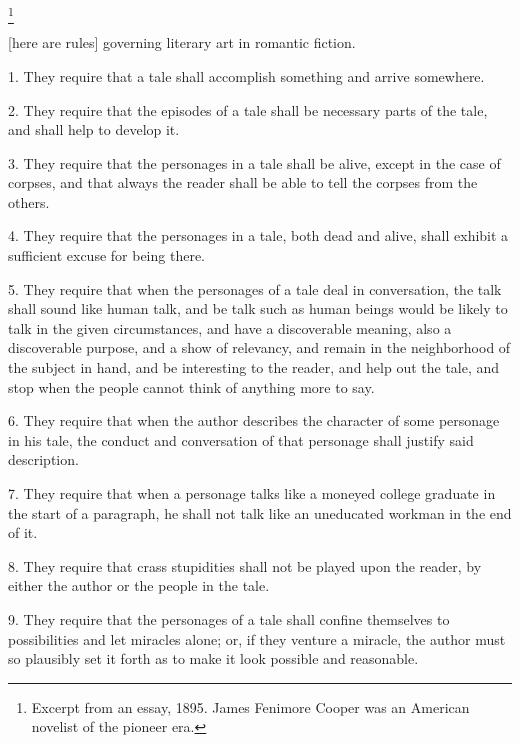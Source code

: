 \documentclass[../../demo.tex]{novelettesubdoc}
\begin{document}
\begin{upperpage}
\null
{}
\footnote{Excerpt from an essay, 1895. James Fenimore Cooper was
an American novelist of the pioneer era.}
\end{upperpage}

[here are rules] governing literary art in romantic fiction.

1. They require that a tale shall accomplish something and arrive
somewhere.

2. They require that the episodes of a tale shall be necessary parts of
the tale, and shall help to develop it.

3. They require that the personages in a tale shall be alive, except in
the case of corpses, and that always the reader shall be able to tell
the corpses from the others.

4. They require that the personages in a tale, both dead and alive,
shall exhibit a sufficient excuse for being there.

5. They require that when the personages of a tale deal in conversation,
the talk shall sound like human talk, and be talk such as human
beings would be likely to talk in the given circumstances, and have
a discoverable meaning, also a discoverable purpose, and a show of
relevancy, and remain in the neighborhood of the subject in hand, and
be interesting to the reader, and help out the tale, and stop when the
people cannot think of anything more to say.

6. They require that when the author describes the character of some
personage in his tale, the conduct and conversation of that personage
shall justify said description.

7. They require that when a personage talks like a moneyed college
graduate in the start of a paragraph, he shall not talk
like an uneducated workman in the end of it.

8. They require that crass stupidities shall not be played upon the
reader, by either the author or the people in the tale.

9. They require that the personages of a tale shall confine themselves
to possibilities and let miracles alone; or, if they venture a miracle,
the author must so plausibly set it forth as to make it look possible
and reasonable.
\end{document}
